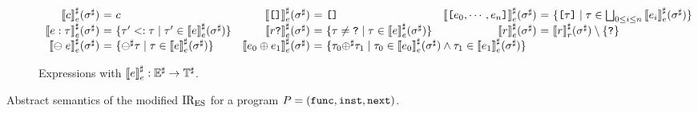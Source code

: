 \begin{figure}[t]
\begin{subfigure}[b]{\textwidth}
\[\begin{array}{r@{~}c@{~}lr@{~}c@{~}lr@{~}c@{~}l}
        \\

        \aseme{\const}(\aenv) &=& \const &

        \aseme{\clist{}}(\aenv) &=& \clist{} &

        \aseme{\clist{\expr_0, \cdots, \expr_n}}(\aenv)
        &=& \{ \clist{\ty} \mid \ty \in \bigjoin_{0 \leq i
        \leq n} \aseme{\expr_i}(\aenv) \}

        \\

        \aseme{\expr: \ty}(\aenv)
        &=& \{ \ty' \subtype \ty \mid \ty' \in
        \aseme{\expr}(\aenv) \} &

        \aseme{\refer \kwexists}(\aenv)
        &=& \{ \ty \neq \tabsent \mid \ty \in
        \aseme{\expr}(\aenv) \} &

        \aseme{\refer}(\aenv)
        &=& \asemr{\refer}(\aenv) \setminus \{ \tabsent \}

        \\

        \aseme{\uop \; \expr}(\aenv)
        &=& \{ \abs{\uop} \ty \mid \ty \in
        \aseme{\expr}(\aenv) \} &

        \aseme{\expr_0 \bop \expr_1}(\aenv)
        &=& \multicolumn{4}{@{}l}{\{ \ty_0 \abs{\bop} \ty_1 \mid \ty_0 \in
        \aseme{\expr_0}(\aenv) \wedge \ty_1 \in \aseme{\expr_1}(\aenv) \}}

        \\
      \end{array}
    \]
    \caption{Expressions with ${\llbracket{e}\rrbracket}^\sharp_e: {\mathbb{E}}^\sharp \rightarrow \mathbb{T}^\sharp$.}
  \end{subfigure}
  \caption{Abstract semantics of the modified ${\text{IR}_\text{ES}}$ for a program $P =
  (\mathtt{func}, \mathtt{inst}, \mathtt{next})$.}
  \vspace*{-1.5em}
  \label{fig:abs-sem}
\end{figure}

